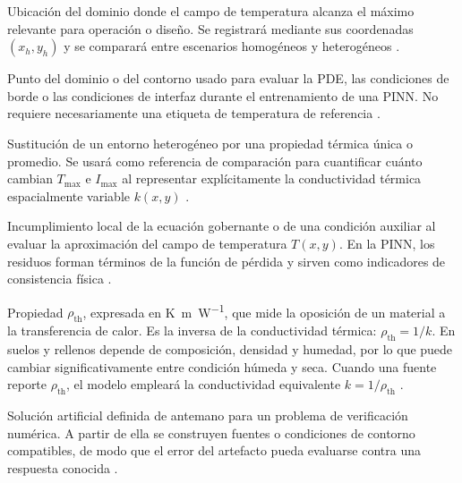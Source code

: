 \documentclass[11pt,a4paper,oneside]{report}
\newcommand{\Tmax}{T_{\max}}
\newcommand{\Imax}{I_{\max}}
\newcommand{\kx}{k(x,y)}
\newcommand{\rhoth}{\rho_{\mathrm{th}}}
\begin{document}
\begin{description}[style=nextline,itemsep=0.5\baselineskip,parsep=0pt,topsep=0.25\baselineskip]
  \item[Punto caliente.] Ubicación del dominio donde el campo de temperatura alcanza el máximo relevante para operación o diseño. Se registrará mediante sus coordenadas $(x_h,y_h)$ y se comparará entre escenarios homogéneos y heterogéneos \parencites[1,6--9]{khumalo2025}[1,10,16]{kim2025}.

  \item[Punto de colocación.] Punto del dominio o del contorno usado para evaluar la PDE, las condiciones de borde o las condiciones de interfaz durante el entrenamiento de una PINN. No requiere necesariamente una etiqueta de temperatura de referencia \parencites[686--690]{raissi2019}[1--2]{lawal2022}.

  \item[Representación homogénea equivalente.] Sustitución de un entorno heterogéneo por una propiedad térmica única o promedio. Se usará como referencia de comparación para cuantificar cuánto cambian $\Tmax$ e $\Imax$ al representar explícitamente la conductividad térmica espacialmente variable $\kx$ \parencites{farouki1981thermal,devries1966thermal}[4--6]{enescu2021}[3--4,41--42,93--99]{cigre2025}.

  \item[Residuo físico.] Incumplimiento local de la ecuación gobernante o de una condición auxiliar al evaluar la aproximación del campo de temperatura $T(x,y)$. En la PINN, los residuos forman términos de la función de pérdida y sirven como indicadores de consistencia física \parencites[686--690]{raissi2019}[1--2,14--17]{lawal2022}.

  \item[Resistividad térmica.] Propiedad $\rhoth$, expresada en \si{\kelvin\metre\per\watt}, que mide la oposición de un material a la transferencia de calor. Es la inversa de la conductividad térmica: $\rhoth=1/k$. En suelos y rellenos depende de composición, densidad y humedad, por lo que puede cambiar significativamente entre condición húmeda y seca. Cuando una fuente reporte $\rhoth$, el modelo empleará la conductividad equivalente $k=1/\rhoth$ \parencites{farouki1981thermal,devries1966thermal}[1,6--9]{khumalo2025}[secciones 4--6]{ieee442}.

  \item[Solución manufacturada.] Solución artificial definida de antemano para un problema de verificación numérica. A partir de ella se construyen fuentes o condiciones de contorno compatibles, de modo que el error del artefacto pueda evaluarse contra una respuesta conocida \parencites{cigre2022}[93--99]{cigre2025}.


\end{description}
\end{document}
